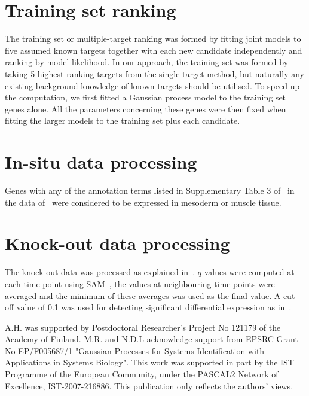 \documentclass{pnastwo}
\begin{document}
\begin{article}
\begin{materials}
  \section{Training set ranking}
  The training set or multiple-target ranking was formed by fitting
  joint models to five assumed known targets together with each new
  candidate independently and ranking by model likelihood.  In our
  approach, the training set was formed by taking 5 highest-ranking
  targets from the single-target method, but naturally any existing background
  knowledge of known targets should be utilised.  To speed up the
  computation, we first fitted a Gaussian process model to the
  training set genes alone.  All the parameters concerning these genes
  were then fixed when fitting the larger models to the training set
  plus each candidate.

  \section{In-situ data processing}
  Genes with any of the annotation terms listed in Supplementary Table
  3 of~\cite{Zinzen2009} in the data of~\cite{Tomancak2002} were
  considered to be expressed in mesoderm or muscle tissue.

  \section{Knock-out data processing}
  The knock-out data was processed as explained
  in~\cite{Sandmann2006a}.  $q$-values were computed at each time
  point using SAM~\cite{Saeed2003,Tusher2001}, the values at
  neighbouring time points were averaged and the minimum of these
  averages was used as the final value.  A cut-off value of 0.1 was
  used for detecting significant differential expression as
  in~\cite{Sandmann2006a}.

\end{materials}

\begin{acknowledgments}
A.H. was supported by Postdoctoral Researcher's Project No 121179 of the Academy of Finland.
M.R. and N.D.L acknowledge support from EPSRC Grant No EP/F005687/1 "Gaussian Processes for Systems Identification with Applications in Systems Biology". 
This work was supported in part by the IST Programme of the European Community, under the PASCAL2 Network of Excellence, IST-2007-216886. This publication only reflects the authors' views.
\end{acknowledgments}




%
\end{article}

\end{document}
